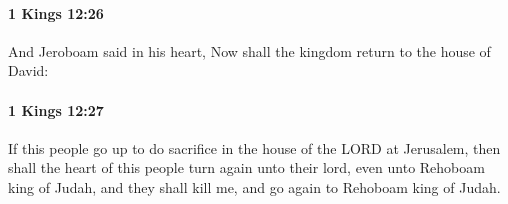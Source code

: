 		\paragraph{1 Kings 12:26} %
			\label{1KINGS-12-26}

			And Jeroboam said in his heart, Now shall the kingdom return to the house of David:


		\paragraph{1 Kings 12:27} %
			\label{1KINGS-12-27}

			If this people go up to do sacrifice in the house of the LORD at Jerusalem, then shall the heart of this people turn again unto their lord, even unto Rehoboam king of Judah, and they shall kill me, and go again to Rehoboam king of Judah.


